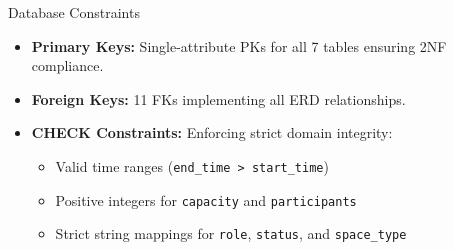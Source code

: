 \begin{frame}{Database Constraints}
    \begin{itemize}
        \item \textbf{Primary Keys:} Single-attribute PKs for all 7 tables ensuring 2NF compliance.
        \vspace{0.2cm}
        \item \textbf{Foreign Keys:} 11 FKs implementing all ERD relationships.
        \vspace{0.2cm}
        \item \textbf{CHECK Constraints:} Enforcing strict domain integrity:
        \begin{itemize}
            \item Valid time ranges (\texttt{end\_time > start\_time})
            \item Positive integers for \texttt{capacity} and \texttt{participants}
            \item Strict string mappings for \texttt{role}, \texttt{status}, and \texttt{space\_type}
        \end{itemize}
    \end{itemize}
\end{frame}
